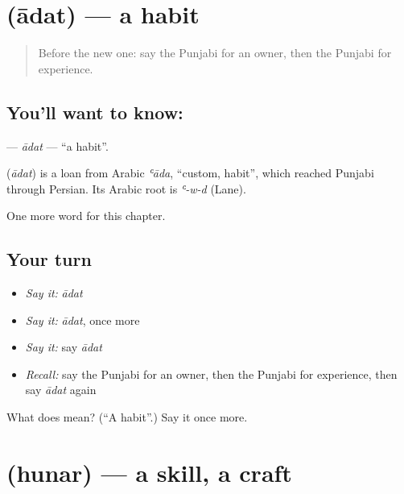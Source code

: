 \section[\texorpdfstring{\pa{ਆਦਤ} (ādat)}{ਆਦਤ (ādat)}]{ (ādat) — a habit}

\label{lesson:PA-C111-adat}



\begin{quote}
Before the new one: say the Punjabi for an owner, then the Punjabi for experience.
\end{quote}

\subsection*{You'll want to know: }
\textbf{} — \emph{ādat} — \textquotedblleft{}a habit\textquotedblright{}.

\begin{cousinweb}
\textbf{} (\emph{ādat}) is a loan from Arabic \emph{ʿāda}, \textquotedblleft{}custom, habit\textquotedblright{}, which reached Punjabi through Persian. Its Arabic root is \emph{ʿ-w-d} (Lane).
\end{cousinweb}

\begin{grammarlens}[title={What you've built}]
One more word for this chapter.
\end{grammarlens}

\subsection*{Your turn}
\begin{itemize}
\raggedright
  \item \emph{Say it:} \emph{ādat}
  \item \emph{Say it:} \emph{ādat}, once more
  \item \emph{Say it:} say \emph{ādat}
  \item \emph{Recall:} say the Punjabi for an owner, then the Punjabi for experience, then say \emph{ādat} again
\end{itemize}

\begin{tcolorbox}[breakable,colback=teal!4,colframe=teal!35!black,title={Before you move on}]
What does  mean? (\textquotedblleft{}A habit\textquotedblright{}.) Say it once more.
\end{tcolorbox}
\section[\texorpdfstring{\pa{ਹੁਨਰ} (hunar)}{ਹੁਨਰ (hunar)}]{ (hunar) — a skill, a craft}

